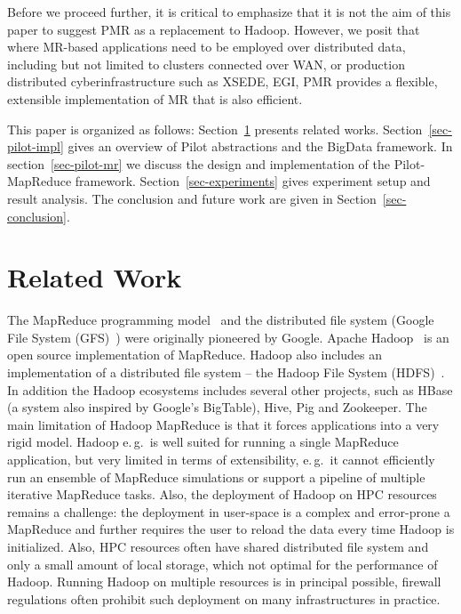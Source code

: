 \documentclass{acm_proc_article-sp}
\newcommand{\upp}{\vspace*{-0.5em}}
\newcommand{\pilot}{Pilot\xspace}
\newcommand{\pilotmapreduce}{Pilot-MapReduce\xspace}
\begin{document}
Before we proceed further, it is critical to emphasize that it is not
the aim of this paper to suggest PMR as a replacement to Hadoop.
However, we posit that where MR-based applications need to be employed
over distributed data, including but not limited to clusters connected
over WAN, or production distributed cyberinfrastructure such as XSEDE,
EGI, PMR provides a flexible, extensible implementation of MR that is
also efficient.
 

This paper is organized as follows: Section~\ref{sec:related_work} presents
related works. Section~\ref{sec-pilot-impl} gives an overview of \pilot
abstractions and the BigData framework. In section~\ref{sec-pilot-mr} we discuss
the design and implementation of the \pilotmapreduce framework.
Section~\ref{sec-experiments} gives experiment setup and result analysis. The
conclusion and future work are given in Section~\ref{sec-conclusion}.

\upp\upp

\section{Related Work}
\label{sec:related_work}
The MapReduce programming model~\cite{Dean:2004:MSD:1251254.1251264} and the
distributed file system (Google File System
(GFS)~\cite{Ghemawat:2003:GFS:1165389.945450}) were originally pioneered by
Google. Apache Hadoop~\cite{hadoop} is an open source implementation of
MapReduce. Hadoop also includes an implementation of a distributed file system
-- the Hadoop File System (HDFS)~\cite{Borthakur:2007fk}. In addition the
Hadoop ecosystems includes several other projects, such as HBase (a system
also inspired by Google's BigTable), Hive, Pig and Zookeeper. The main
limitation of Hadoop MapReduce is that it forces applications into a very
rigid model. Hadoop e.\,g.\ is well suited for running a single MapReduce
application, but very limited in terms of extensibility, e.\,g.\ it cannot
efficiently run an ensemble of MapReduce simulations or support a pipeline of
multiple iterative MapReduce tasks. Also, the deployment of Hadoop on HPC
resources remains a challenge: the deployment in user-space is a complex and
error-prone a MapReduce and further requires the user to reload the data every
time Hadoop is initialized. Also, HPC resources often have shared distributed
file system and only a small amount of local storage, which not optimal for
the performance of Hadoop. Running Hadoop on multiple resources is in
principal possible, firewall regulations often prohibit such deployment on
many infrastructures in practice.
\end{document}
